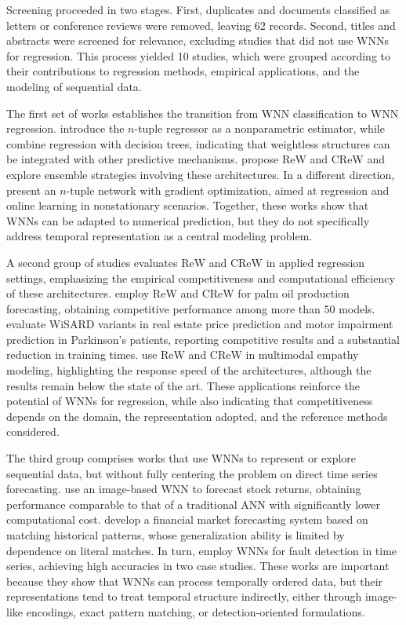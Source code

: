 \documentclass[final,3p,times,twocolumn,authoryear]{elsarticle}
\begin{document}
Screening proceeded in two stages. First, duplicates and documents classified as letters or conference reviews were removed, leaving 62 records. Second, titles and abstracts were screened for relevance, excluding studies that did not use WNNs for regression. This process yielded 10 studies, which were grouped according to their contributions to regression methods, empirical applications, and the modeling of sequential data.

The first set of works establishes the transition from WNN classification to WNN regression. \citet{kolcz_ntuple_1996} introduce the $n$-tuple regressor as a nonparametric estimator, while \citet{kolcz_ntuple_2000} combine regression with decision trees, indicating that weightless structures can be integrated with other predictive mechanisms. \citet{lusquino_extending_2020} propose ReW and CReW and explore ensemble strategies involving these architectures. In a different direction, \citet{katopodis_functional_2022} present an $n$-tuple network with gradient optimization, aimed at regression and online learning in nonstationary scenarios. Together, these works show that WNNs can be adapted to numerical prediction, but they do not specifically address temporal representation as a central modeling problem.

A second group of studies evaluates ReW and CReW in applied regression settings, emphasizing the empirical competitiveness and computational efficiency of these architectures. \citet{lusquino_prediction_2019} employ ReW and CReW for palm oil production forecasting, obtaining competitive performance among more than 50 models. \citet{lusquino_extending_2020} evaluate WiSARD variants in real estate price prediction and motor impairment prediction in Parkinson's patients, reporting competitive results and a substantial reduction in training times. \citet{lusquino_aweightless_2020} use ReW and CReW in multimodal empathy modeling, highlighting the response speed of the architectures, although the results remain below the state of the art. These applications reinforce the potential of WNNs for regression, while also indicating that competitiveness depends on the domain, the representation adopted, and the reference methods considered.

The third group comprises works that use WNNs to represent or explore sequential data, but without fully centering the problem on direct time series forecasting. \citet{desouza_fast_2011} use an image-based WNN to forecast stock returns, obtaining performance comparable to that of a traditional ANN with significantly lower computational cost. \citet{alhassan_using_2011} develop a financial market forecasting system based on matching historical patterns, whose generalization ability is limited by dependence on literal matches. In turn, \citet{oliveira_fault_2017} employ WNNs for fault detection in time series, achieving high accuracies in two case studies. These works are important because they show that WNNs can process temporally ordered data, but their representations tend to treat temporal structure indirectly, either through image-like encodings, exact pattern matching, or detection-oriented formulations.
\end{document}
